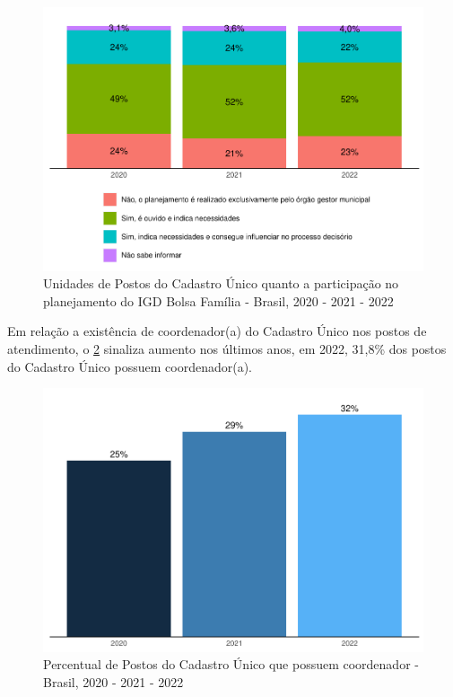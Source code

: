 \documentclass[
  brazilian]{report}
\begin{document}
\begin{figure}
\includegraphics{Censo-SUAS-2022_files/figure-latex/igdbolsa-1} \caption[Unidades de Postos do Cadastro Único quanto a participação no planejamento do IGD Bolsa Família - Brasil, 2020 - 2021 - 2022]{Unidades de Postos do Cadastro Único quanto a participação no planejamento do IGD Bolsa Família - Brasil, 2020 - 2021 - 2022}\label{fig:igdbolsa}
\end{figure}

Em relação a existência de coordenador(a) do Cadastro Único nos postos
de atendimento, o \cref{fig:coord_cadunico} sinaliza aumento nos últimos
anos, em 2022, 31,8\% dos postos do Cadastro Único possuem
coordenador(a).

\begin{figure}
\includegraphics{Censo-SUAS-2022_files/figure-latex/coord_cadunico-1} \caption[Percentual de Postos do Cadastro Único que possuem coordenador - Brasil, 2020 - 2021 - 2022]{Percentual de Postos do Cadastro Único que possuem coordenador - Brasil, 2020 - 2021 - 2022}\label{fig:coord_cadunico}
\end{figure}
\end{document}
